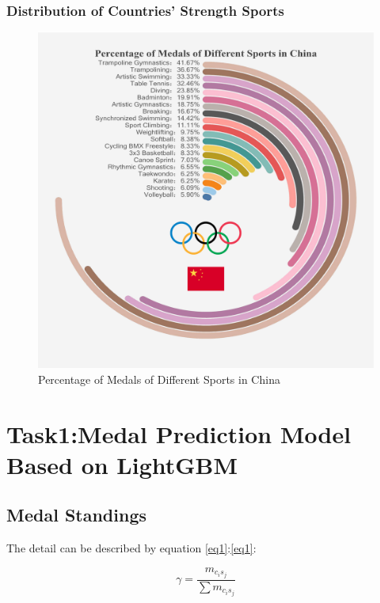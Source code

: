 \documentclass[12pt]{article}  %
\begin{document}
\subsubsection{Distribution of Countries' Strength Sports}


\begin{figure}[htbp]
	\centering
	\includegraphics[width=12cm]{img/Percentage.jpg}
	\caption{Percentage of Medals of Different Sports in China}
	\label{fig:aa}
\end{figure}






\section{Task1:Medal Prediction Model Based on LightGBM}
\subsection{Medal Standings}
The detail can be described by equation \eqref{eq1}:\autoref{eq1}:




\begin{equation}
\gamma = \frac{m_{c_i s_j}}{\sum m_{c_i s_j}}
\end{equation}
\end{document}
